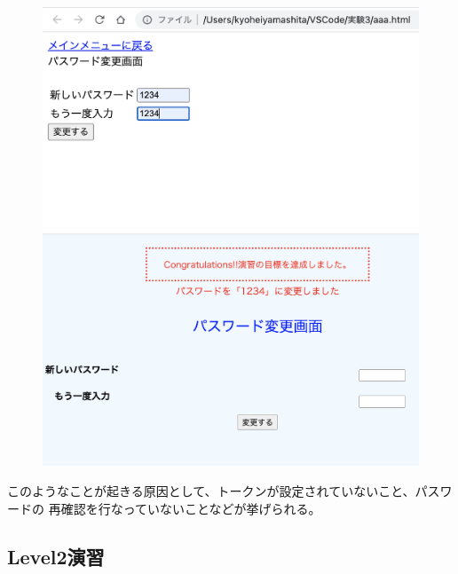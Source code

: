 \documentclass[dvipdfmx,autodetect-engine,titlepage]{jsarticle}
\begin{document}
\begin{figure}[h]
  \centering
  \begin{minipage}[b]{0.45\linewidth}
  \begin{center}
    \includegraphics[keepaspectratio,scale=0.35]{pic24.png}
    \end{center}
    \caption{}
  \end{minipage}
  \begin{minipage}[b]{0.45\linewidth}
  \begin{center}
    \includegraphics[keepaspectratio,scale=0.35]{pic25.png}
    \end{center}
    \caption{}
  \end{minipage}
\end{figure}

このようなことが起きる原因として、トークンが設定されていないこと、パスワードの
再確認を行なっていないことなどが挙げられる。

\subsection{Level2演習}
\end{document}
